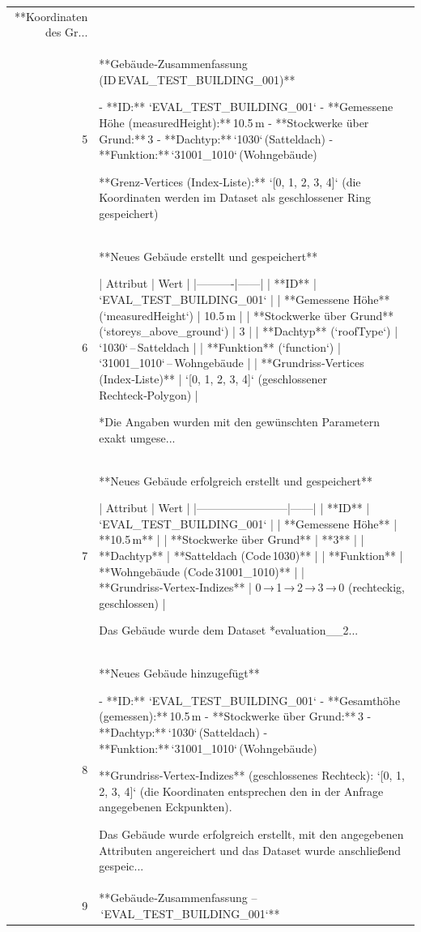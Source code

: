 \documentclass[a4paper,11pt]{article}
\begin{document}
\begin{table}[ht]
\begin{tabular}{r p{12cm}}
**Koordinaten des Gr... \\
5 & **Gebäude‑Zusammenfassung (ID EVAL\_TEST\_BUILDING\_001)**  

- **ID:** `EVAL\_TEST\_BUILDING\_001`  
- **Gemessene Höhe (measuredHeight):** 10.5 m  
- **Stockwerke über Grund:** 3  
- **Dachtyp:** `1030` (Satteldach)  
- **Funktion:** `31001\_1010` (Wohngebäude)  

**Grenz‑Vertices (Index‑Liste):**  
`[0, 1, 2, 3, 4]`  (die Koordinaten werden im Dataset als geschlossener Ring gespeichert)   \\
6 & **Neues Gebäude erstellt und gespeichert**

| Attribut | Wert |
|----------|------|
| **ID** | `EVAL\_TEST\_BUILDING\_001` |
| **Gemessene Höhe** (`measuredHeight`) | 10.5 m |
| **Stockwerke über Grund** (`storeys\_above\_ground`) | 3 |
| **Dachtyp** (`roofType`) | `1030` – Satteldach |
| **Funktion** (`function`) | `31001\_1010` – Wohngebäude |
| **Grundriss‑Vertices (Index‑Liste)** | `[0, 1, 2, 3, 4]` (geschlossener Rechteck‑Polygon) |

*Die Angaben wurden mit den gewünschten Parametern exakt umgese... \\
7 & **Neues Gebäude erfolgreich erstellt und gespeichert**

| Attribut                | Wert |
|------------------------|------|
| **ID**                 | `EVAL\_TEST\_BUILDING\_001` |
| **Gemessene Höhe**     | **10.5 m** |
| **Stockwerke über Grund** | **3** |
| **Dachtyp**            | **Satteldach (Code 1030)** |
| **Funktion**           | **Wohngebäude (Code 31001\_1010)** |
| **Grundriss‑Vertex‑Indizes** | 0 → 1 → 2 → 3 → 0 (rechteckig, geschlossen) |

Das Gebäude wurde dem Dataset *evaluation\_\_2... \\
8 & **Neues Gebäude hinzugefügt**

- **ID:** `EVAL\_TEST\_BUILDING\_001`  
- **Gesamthöhe (gemessen):** 10.5 m  
- **Stockwerke über Grund:** 3  
- **Dachtyp:** `1030` (Satteldach)  
- **Funktion:** `31001\_1010` (Wohngebäude)  

**Grundriss‑Vertex‑Indizes** (geschlossenes Rechteck):  
`[0, 1, 2, 3, 4]`  (die Koordinaten entsprechen den in der Anfrage angegebenen Eckpunkten).  

Das Gebäude wurde erfolgreich erstellt, mit den angegebenen Attributen angereichert und das Dataset wurde anschließend gespeic... \\
9 & **Gebäude‑Zusammenfassung – `EVAL\_TEST\_BUILDING\_001`**


\end{tabular}
\end{table}
\end{document}
